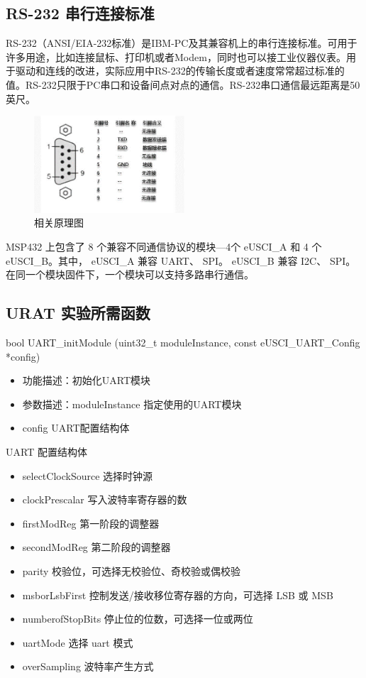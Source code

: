 \documentclass[a4paper,10pt,UTF8]{paper}
\numberwithin{equation}{section}
\numberwithin{figure}{section}
\begin{document}
\subsection{RS-232 串行连接标准}

RS-232（ANSI/EIA-232标准）是IBM-PC及其兼容机上的串行连接标准。可用于许多用途，比如连接鼠标、打印机或者Modem，同时也可以接工业仪器仪表。用于驱动和连线的改进，实际应用中RS-232的传输长度或者速度常常超过标准的值。RS-232只限于PC串口和设备间点对点的通信。RS-232串口通信最远距离是50英尺。

\begin{figure}[h]
  \centering
  \includegraphics[width=0.5\textwidth]{img/3.PNG}
  \caption{相关原理图}
  \label{fig:3}
\end{figure}

MSP432 上包含了 8 个兼容不同通信协议的模块—4个 eUSCI\_A 和 4 个 eUSCI\_B。其中， eUSCI\_A 兼容 UART、 SPI。 eUSCI\_B 兼容 I2C、 SPI。在同一个模块固件下，一个模块可以支持多路串行通信。

\subsection{URAT 实验所需函数}

\begin{ccode}
  bool UART_initModule (uint32_t moduleInstance, 
		      const eUSCI_UART_Config *config)
\end{ccode}

\begin{itemize}
  \item 功能描述：初始化UART模块
  \item 参数描述：moduleInstance	指定使用的UART模块
  \item config		UART配置结构体
\end{itemize}

UART 配置结构体

\begin{itemize}
  \item selectClockSource  选择时钟源
  \item clockPrescalar	   写入波特率寄存器的数
  \item firstModReg	   第一阶段的调整器
  \item secondModReg	   第二阶段的调整器
  \item parity	           校验位，可选择无校验位、奇校验或偶校验
  \item msborLsbFirst	   控制发送/接收移位寄存器的方向，可选择 LSB 或 MSB
  \item numberofStopBits   停止位的位数，可选择一位或两位
  \item uartMode	   选择 uart 模式
  \item overSampling	   波特率产生方式
\end{itemize}
\end{document}
